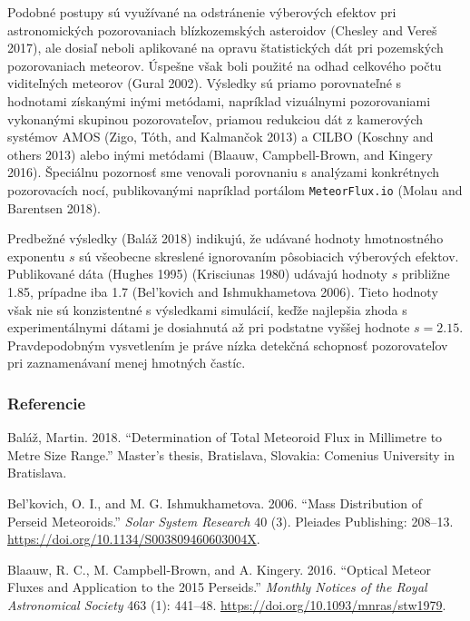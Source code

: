 Podobné postupy sú využívané na odstránenie výberových efektov pri
astronomických pozorovaniach blízkozemských asteroidov (Chesley and
Vereš 2017), ale dosiaľ neboli aplikované na opravu štatistických dát
pri pozemských pozorovaniach meteorov. Úspešne však boli použité na
odhad celkového počtu viditeľných meteorov (Gural 2002). Výsledky sú
priamo porovnateľné s hodnotami získanými inými metódami, napríklad
vizuálnymi pozorovaniami vykonanými skupinou pozorovateľov, priamou
redukciou dát z kamerových systémov AMOS (Zigo, Tóth, and Kalmančok
2013) a CILBO (Koschny and others 2013) alebo inými metódami (Blaauw,
Campbell-Brown, and Kingery 2016). Špeciálnu pozornosť sme venovali
porovnaniu s analýzami konkrétnych pozorovacích nocí, publikovanými
napríklad portálom \texttt{MeteorFlux.io} (Molau and Barentsen 2018).

Predbežné výsledky (Baláž 2018) indikujú, že udávané hodnoty
hmotnostného exponentu \(s\) sú všeobecne skreslené ignorovaním
pôsobiacich výberových efektov. Publikované dáta (Hughes 1995)
(Krisciunas 1980) udávajú hodnoty \(s\) približne \num{1.85}, prípadne
iba \num{1.7} (Bel'kovich and Ishmukhametova 2006). Tieto hodnoty však
nie sú konzistentné s výsledkami simulácií, keďže najlepšia zhoda s
experimentálnymi dátami je dosiahnutá až pri podstatne vyššej hodnote
\(s = \num{2.15}\). Pravdepodobným vysvetlením je práve nízka detekčná
schopnosť pozorovateľov pri zaznamenávaní menej hmotných častíc.

\subsubsection*{Referencie}\label{referencie}

\hypertarget{refs}{}
\hypertarget{ref-balaz2018}{}
Baláž, Martin. 2018. ``Determination of Total Meteoroid Flux in
Millimetre to Metre Size Range.'' Master's thesis, Bratislava, Slovakia:
Comenius University in Bratislava.

\hypertarget{ref-belkovich2006}{}
Bel'kovich, O. I., and M. G. Ishmukhametova. 2006. ``Mass Distribution
of Perseid Meteoroids.'' \emph{Solar System Research} 40 (3). Pleiades
Publishing: 208--13. \url{https://doi.org/10.1134/S003809460603004X}.

\hypertarget{ref-blaauw2016}{}
Blaauw, R. C., M. Campbell-Brown, and A. Kingery. 2016. ``Optical Meteor
Fluxes and Application to the 2015 Perseids.'' \emph{Monthly Notices of
the Royal Astronomical Society} 463 (1): 441--48.
\url{https://doi.org/10.1093/mnras/stw1979}.

